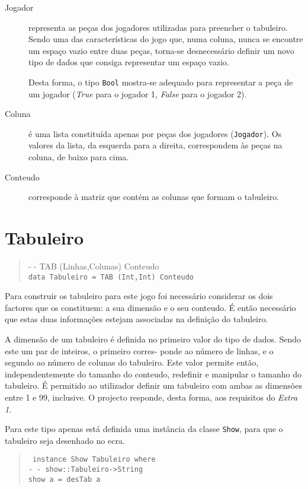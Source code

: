 \documentclass[a4paper,titlepage]{scrreprt}
\begin{document}
		\begin{description}
			\item[Jogador] representa as peças dos jogadores utilizadas para preencher o tabuleiro. Sendo uma das características
			do jogo que, numa coluna, nunca se encontre um espaço vazio entre duas peças, torna-se desnecessário definir um novo
			tipo de dados que consiga representar um espaço vazio.
			
			Desta forma, o tipo {\tt Bool} mostra-se adequado para representar a peça de um jogador ({\it True} para o jogador 1,
			{\it False} para o jogador 2).
			\item[Coluna] é uma lista constituída apenas por peças dos jogadores ({\tt Jogador}). Os valores da lista, da esquerda
			para a direita, correspondem às peças na coluna, de baixo para cima.
			\item[Conteudo] corresponde à matriz que contém as colunas que formam o tabuleiro.
		\end{description}
	\section{Tabuleiro}
		\begin{quote}
			{\small - - TAB (Linhas,Colunas) Conteudo}\\
			{\tt data Tabuleiro = TAB (Int,Int) Conteudo}
		\end{quote}
		Para construir os tabuleiro para este jogo foi necessário considerar os dois factores que os constituem: a sua dimensão e
		o seu conteudo. É então necessário que estas duas informações estejam associadas na definição do tabuleiro.
		
		A dimensão de um tabuleiro é definida no primeiro valor do tipo de dados. Sendo este um par de inteiros, o primeiro corres-
		ponde ao número de linhas, e o segundo ao número de colunas do tabuleiro. Este valor permite então, independentemente do
		tamanho do conteudo, redefinir e manipular o tamanho do tabuleiro. É permitido ao utilizador definir um tabuleiro com ambas as
		dimensões entre 1 e 99, inclusive. O projecto responde, desta forma, aos requisitos do {\it Extra 1}.
		
		Para este tipo apenas está definida uma instância da classe {\tt Show}, para que o tabuleiro seja desenhado no ecra.
		\begin{quote}
			{\tt
			instance Show Tabuleiro where\\
			- - show::Tabuleiro->String\\
			show a = desTab a
			}
		\end{quote}
\end{document}
